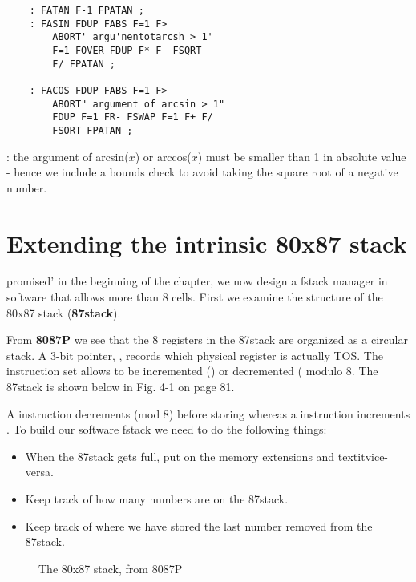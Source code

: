 \begin{lstlisting}
    : FATAN F-1 FPATAN ;
    : FASIN FDUP FABS F=1 F>
        ABORT' argu'nentotarcsh > 1'
        F=1 FOVER FDUP F* F- FSQRT
        F/ FPATAN ;

    : FACOS FDUP FABS F=1 F>
        ABORT" argument of arcsin > 1"
        FDUP F=1 FR- FSWAP F=1 F+ F/
        FSORT FPATAN ;
\end{lstlisting}

\leftbar[1\linewidth]
\Note: the argument of arcsin($x$) or arccos($x$) must be smaller than
1 in absolute value - hence we include a bounds check to avoid taking the square root of a negative number.
\endleftbar

\section{Extending the intrinsic 80x87 stack}
 promised' in the beginning of the chapter, we now design
a fstack manager in software that allows more than 8 cells. First we examine the structure of the 80x87 stack (\textbf{87stack}).

From \textbf{8087P} we see that the 8 registers in the 87stack are organized as a circular stack. A 3-bit pointer, , records which physical register is actually TOS. The instruction set allows  to be incremented () or decremented ( modulo 8. The 87stack is shown below in Fig. 4-1 on page 81.

A  instruction decrements  (mod 8) before storing whereas a  instruction increments . To build our software fstack we need to do the following things:
\begin{itemize}
    \item When the 87stack gets full, put  on the memory extensions and textit{vice-versa}.
    \item Keep track of how many numbers are on the 87stack.
    \item Keep track of where we have stored the last number removed from the 87stack.
\end{itemize}

\begin{figure}
    \center
    \caption{The 80x87 stack, from 8087P}
    \label{fig:04_01}
\end{figure}

